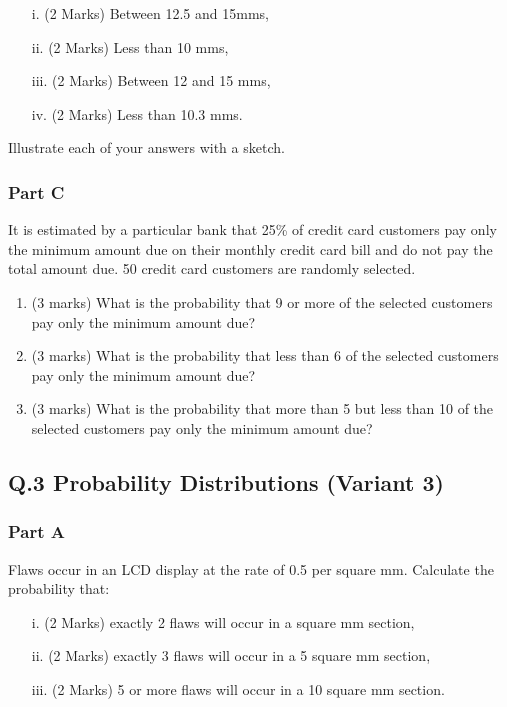 \documentclass[a4paper,12pt]{article}
\begin{document}
\begin{itemize}
\item [i.](2 Marks)	Between 12.5 and 15mms,
\item [ii.](2 Marks) Less than 10 mms,
\item [iii.](2 Marks) Between 12 and 15 mms,
\item [iv.](2 Marks) Less than 10.3 mms.
\end{itemize}
\noindent Illustrate each of your answers with a sketch.

\subsubsection*{Part C} %
It is estimated by a particular bank that 25\% of credit card customers pay only the minimum amount due on their monthly credit card bill and do not pay the total amount due. 50 credit card customers are randomly selected.
\begin{enumerate}
\item (3 marks)	What is the probability that 9 or more of the selected customers pay only the minimum amount due?
\item (3 marks) What is the probability that less than 6 of the selected customers pay only the minimum amount due?
\item (3 marks)	What is the probability that more than 5 but less than 10 of the selected customers pay only the minimum amount due?
\end{enumerate}



\newpage
\subsection*{Q.3 Probability Distributions (Variant 3)}
\subsubsection*{Part A} %
Flaws occur in an LCD display at the rate of 0.5 per square mm.  Calculate the probability that:

\begin{itemize}
\item [i.](2 Marks)	exactly 2 flaws will occur in a square mm section,
\item [ii.](2 Marks) exactly 3 flaws will occur in a 5 square mm section,
\item [iii.](2 Marks) 5 or more flaws will occur in a 10 square mm section.
\end{itemize}
\end{document}
